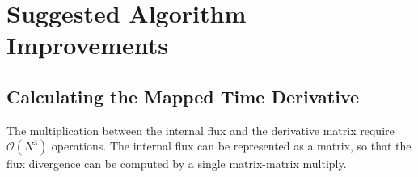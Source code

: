 \documentclass{softwaremanual}
\begin{document}
%
%
%
%

\clearpage

\section{Suggested Algorithm Improvements}

 \subsection{Calculating the Mapped Time Derivative}
  The multiplication between the internal flux and the derivative matrix require $\mathcal{O}(N^3)$ operations. The internal flux can be represented as a matrix, so that the flux divergence can be computed by a single matrix-matrix multiply.
\end{document}
